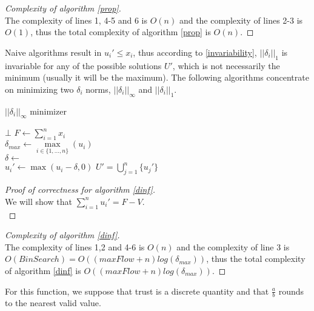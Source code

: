 \documentclass[11pt]{article}
\theoremstyle{definition}
\theoremstyle{corollary}
\begin{document}
    \begin{proof}[Complexity of algorithm \ref{prop}] \ \\
       The complexity of lines 1, 4-5 and 6 is $O(n)$ and the complexity of lines 2-3 is $O(1)$, thus the total complexity
       of algorithm \ref{prop} is $O(n)$.
    \end{proof}
    Naive algorithms result in $u_i' \leq x_i$, thus according to \ref{invariability}, $||\delta_i||_1$ is invariable for
    any of the possible solutions $U'$, which is not necessarily the minimum (usually it will be the maximum). The following
    algorithms concentrate on minimizing two $\delta_i$ norms, $||\delta_i||_\infty$ and $||\delta_i||_1$. \\
    \begin{algorithm}[H]
       \label{dinf}
       \caption{$||\delta_i||_\infty$ minimizer}
          {\Return $\bot$}
       $F \gets \sum\limits_{i=1}^{n}x_i$ \\
       $\delta_{max} \gets \max\limits_{i \in \{1,...,n\}}{(u_i)}$ \\
       $\delta \gets$  \\
          {$u_i' \gets \max{(u_i - \delta, 0)}$}
       \Return $U' = \bigcup\limits_{j=1}^{n}\{u_j'\}$
    \end{algorithm}
    \begin{proof}[Proof of correctness for algorithm \ref{dinf}] \ \\
       We will show that $\sum\limits_{i=1}^{n}u_i' = F - V$. \\
       
    \end{proof}
    \begin{proof}[Complexity of algorithm \ref{dinf}] \ \\
       The complexity of lines 1,2 and 4-6 is $O(n)$ and the complexity of line 3 is $O(BinSearch) = O((maxFlow + n)
       log(\delta_{max}))$, thus the total complexity of algorithm \ref{dinf} is $O((maxFlow + n)log(\delta_{max}))$.
    \end{proof}
    For this function, we suppose that trust is a discrete quantity and that
    $\frac{a}{b}$ rounds to the nearest valid value.
\end{document}
